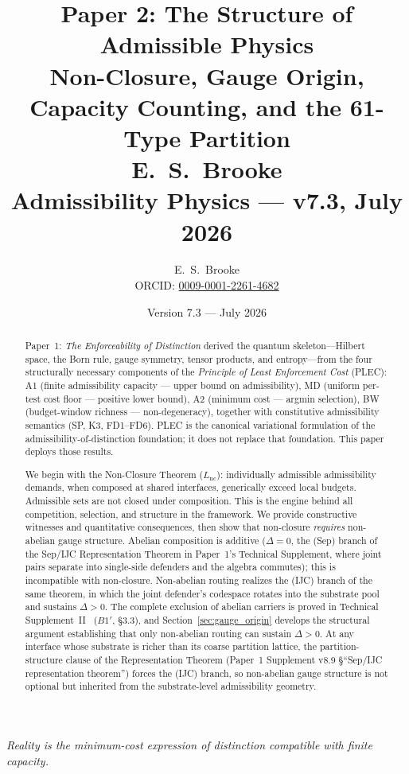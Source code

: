 \documentclass[11pt]{article}
\title{
  \textbf{Paper 2: The Structure of Admissible Physics}\\
  \large Non-Closure, Gauge Origin, Capacity Counting, and the 61-Type Partition\\
  \normalsize E.\ S.\ Brooke\\
  Admissibility Physics --- v7.3, July 2026
}
\author{E.\ S.\ Brooke \\[0.4em] \normalsize ORCID: \href{https://orcid.org/0009-0001-2261-4682}{0009-0001-2261-4682}}
\date{Version 7.3 --- July 2026}
\begin{document}
\maketitle

\bigskip

\begin{center}
\textit{Reality is the minimum-cost expression of distinction compatible with finite capacity.}
\end{center}

\bigskip

\begin{abstract}
\noindent
Paper~1: \emph{The Enforceability of Distinction} derived the quantum skeleton---Hilbert space, the Born rule, gauge symmetry, tensor products, and entropy---from the four structurally necessary components of the \emph{Principle of Least Enforcement Cost} (PLEC): A1 (finite admissibility capacity --- upper bound on admissibility), MD (uniform per-test cost floor --- positive lower bound), A2 (minimum cost --- argmin selection), BW (budget-window richness --- non-degeneracy), together with constitutive admissibility semantics (SP, K3, FD1--FD6).  PLEC is the canonical variational formulation of the admissibility-of-distinction foundation; it does not replace that foundation.  This paper deploys those results.

We begin with the Non-Closure Theorem ($L_{\mathrm{nc}}$): individually admissible admissibility demands, when composed at shared interfaces, generically exceed local budgets.  Admissible sets are not closed under composition.  This is the engine behind all competition, selection, and structure in the framework.  We provide constructive witnesses and quantitative consequences, then show that non-closure \emph{requires} non-abelian gauge structure. Abelian composition is additive ($\Delta = 0$, the (Sep) branch of the Sep/IJC Representation Theorem in Paper~1's Technical Supplement, where joint pairs separate into single-side defenders and the algebra commutes); this is incompatible with non-closure. Non-abelian routing realizes the (IJC) branch of the same theorem, in which the joint defender's codespace rotates into the substrate pool and sustains $\Delta > 0$. The complete exclusion of abelian carriers is proved in Technical Supplement~II~\cite{BrookeP2FoundSupplement} ($B1'$, \S3.3), and Section~\ref{sec:gauge_origin} develops the structural argument establishing that only non-abelian routing can sustain $\Delta > 0$.  At any interface whose substrate is richer than its coarse partition lattice, the partition-structure clause of the Representation Theorem (Paper~1 Supplement v8.9 \S``Sep/IJC representation theorem'') forces the (IJC) branch, so non-abelian gauge structure is not optional but inherited from the substrate-level admissibility geometry.


\end{abstract}
\end{document}
